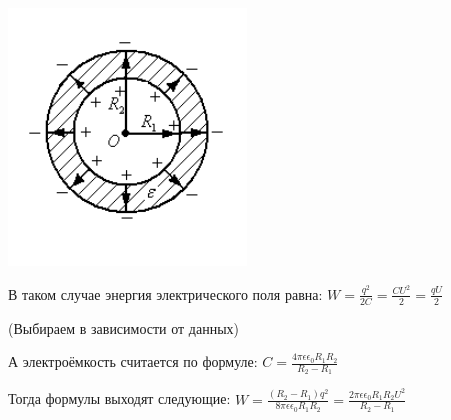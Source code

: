 \documentclass[12pt]{report}
\begin{document}
\begin{center}
    \includegraphics{graphics/t16.PNG}
\end{center}

В таком случае энергия электрического поля равна: $W = \frac{q^2}{2C} = \frac{C U^2}{2} = \frac{qU}{2}$

(Выбираем в зависимости от данных)

А электроёмкость считается по формуле: $C = \frac{4 \pi \epsilon \epsilon_0 R_1 R_2}{R_2 - R_1}$

Тогда формулы выходят следующие: $W = \frac{(R_2 - R_1) q^2}{8 \pi \epsilon \epsilon_0 R_1 R_2} = \frac{2 \pi \epsilon \epsilon_0 R_1 R_2 U^2}{R_2 - R_1}$
\end{document}

